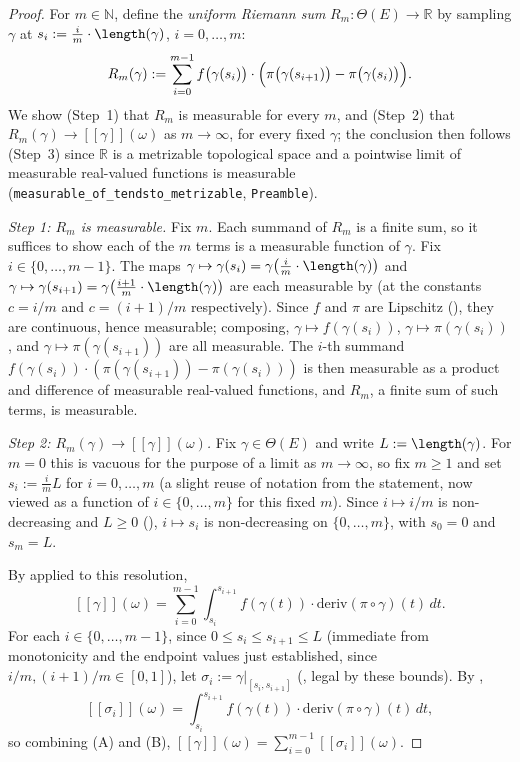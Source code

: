 \begin{proof}
  For $m \in \mathbb{N}$, define the \emph{uniform Riemann sum} $R_m \colon \Theta(E) \to
  \mathbb{R}$ by sampling $\gamma$ at $s_i := \frac{i}{m}\cdot\length(\gamma)$, $i = 0,\dots,m$:
  \[
    R_m(\gamma) := \sum_{i=0}^{m-1} f\bigl(\gamma(s_i)\bigr) \cdot
      \Bigl(\pi\bigl(\gamma(s_{i+1})\bigr) - \pi\bigl(\gamma(s_i)\bigr)\Bigr)
    .
  \]
  We show (Step~1) that $R_m$ is measurable for every $m$, and (Step~2) that
  $R_m(\gamma) \to [[\gamma]](\omega)$ as $m \to \infty$, for every fixed $\gamma$; the conclusion
  then follows (Step~3) since $\mathbb{R}$ is a metrizable topological space and a pointwise limit
  of measurable real-valued functions is measurable
  (\texttt{measurable\_of\_tendsto\_metrizable}, \texttt{Preamble}).

  \emph{Step 1: $R_m$ is measurable.} Fix $m$. Each summand of $R_m$ is a finite sum, so it suffices
  to show each of the $m$ terms is a measurable function of $\gamma$. Fix $i \in \{0,\dots,m-1\}$.
  The maps $\gamma \mapsto \gamma(s_i) = \gamma\bigl(\frac{i}{m}\cdot\length(\gamma)\bigr)$ and
  $\gamma \mapsto \gamma(s_{i+1}) = \gamma\bigl(\frac{i+1}{m}\cdot\length(\gamma)\bigr)$ are each
  measurable by  (at the constants $c = i/m$ and $c=(i+1)/m$
  respectively). Since $f$ and $\pi$ are Lipschitz (), they are continuous, hence
  measurable; composing, $\gamma \mapsto f(\gamma(s_i))$, $\gamma \mapsto \pi(\gamma(s_i))$, and
  $\gamma \mapsto \pi(\gamma(s_{i+1}))$ are all measurable. The $i$-th summand
  $f(\gamma(s_i))\cdot(\pi(\gamma(s_{i+1}))-\pi(\gamma(s_i)))$ is then measurable as a product and
  difference of measurable real-valued functions, and $R_m$, a finite sum of such terms, is
  measurable.

  \emph{Step 2: $R_m(\gamma) \to [[\gamma]](\omega)$.} Fix $\gamma \in \Theta(E)$ and write
  $L := \length(\gamma)$. For $m = 0$ this is vacuous for the purpose of a limit as $m \to \infty$,
  so fix $m \ge 1$ and set $s_i := \frac{i}{m}L$ for $i = 0,\dots,m$ (a slight reuse of notation
  from the statement, now viewed as a function of $i \in \{0,\dots,m\}$ for this fixed $m$). Since
  $i \mapsto i/m$ is non-decreasing and $L \ge 0$ (), $i \mapsto s_i$ is
  non-decreasing on $\{0,\dots,m\}$, with $s_0 = 0$ and $s_m = L$.

  By  applied to this resolution,
  \[
    [[\gamma]](\omega) = \sum_{i=0}^{m-1} \int_{s_i}^{s_{i+1}} f(\gamma(t)) \cdot
      \mathrm{deriv}(\pi\circ\gamma)(t)\,dt
    . \tag{A}
  \]
  For each $i \in \{0,\dots,m-1\}$, since $0 \le s_i \le s_{i+1} \le L$ (immediate from
  monotonicity and the endpoint values just established, since $i/m, (i+1)/m \in [0,1]$), let
  $\sigma_i := \gamma|_{[s_i,s_{i+1}]}$ (, legal by these bounds). By
  ,
  \[
    [[\sigma_i]](\omega) = \int_{s_i}^{s_{i+1}} f(\gamma(t)) \cdot \mathrm{deriv}(\pi\circ\gamma)(t)\,dt
    , \tag{B}
  \]
  so combining (A) and (B), $[[\gamma]](\omega) = \sum_{i=0}^{m-1} [[\sigma_i]](\omega)$.


\end{proof}
